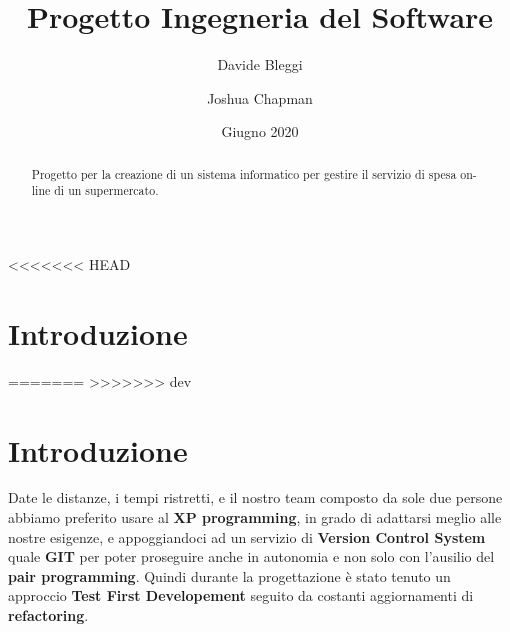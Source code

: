 \documentclass[12pt, a4paper]{article}
\title{Progetto Ingegneria del Software}
\author{Davide Bleggi \and Joshua Chapman}
\date{Giugno 2020}
\numberwithin{equation}{section} %
\begin{document}
\begin{titlepage}
  \maketitle
\end{titlepage}

\begin{abstract}
  Progetto per la creazione di un sistema informatico per gestire il servizio 
  di spesa on-line di un supermercato.
\end{abstract}

<<<<<<< HEAD
\tableofcontents
\newpage

\section{Introduzione}
=======
>>>>>>> dev

\tableofcontents
\newpage


\section{Introduzione}
Date le distanze, i tempi ristretti, e il nostro team composto da sole due persone abbiamo preferito usare al \textbf{XP programming}, in grado di adattarsi meglio alle nostre esigenze, e appoggiandoci ad un servizio di \textbf{Version Control System} quale \textbf{GIT} per poter proseguire anche in autonomia e non solo con l'ausilio del \textbf{pair programming}. Quindi durante la progettazione è stato tenuto un approccio \textbf{Test First Developement} seguito da costanti aggiornamenti di \textbf{refactoring}.
\end{document}
